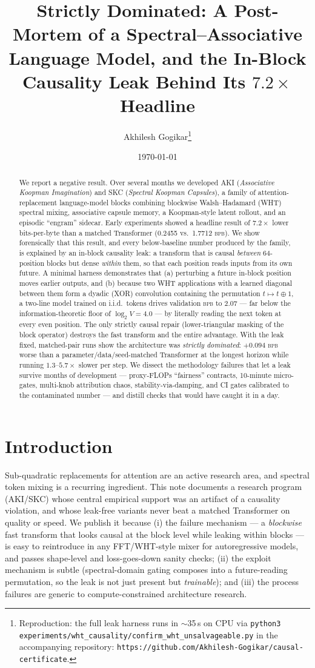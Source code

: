 \documentclass[11pt]{article}
\title{Strictly Dominated: A Post-Mortem of a Spectral--Associative Language
Model, and the In-Block Causality Leak Behind Its $7.2\times$ Headline}
\author{Akhilesh Gogikar\thanks{Reproduction: the full leak harness runs in
$\sim$35\,s on CPU via \texttt{python3
experiments/wht\_causality/confirm\_wht\_unsalvageable.py} in the accompanying
repository: \texttt{https://github.com/Akhilesh-Gogikar/causal-certificate}.}}
\date{\today}
\newcommand{\bpb}{\textsc{bpb}}
\begin{document}
\maketitle

\begin{abstract}
We report a negative result. Over several months we developed AKI
(\emph{Associative Koopman Imagination}) and SKC (\emph{Spectral Koopman
Capsules}), a family
of attention-replacement language-model blocks combining blockwise
Walsh--Hadamard (WHT) spectral mixing, associative capsule memory, a Koopman-style
latent rollout, and an episodic ``engram'' sidecar. Early experiments showed a
headline result of $7.2\times$ lower bits-per-byte than a matched Transformer
(0.2455 vs.\ 1.7712 \bpb). We show forensically that this result, and every
below-baseline number produced by the family, is explained by an in-block
causality leak: a transform that is causal \emph{between} 64-position blocks but
dense \emph{within} them, so that each position reads inputs from its own
future. A minimal harness demonstrates that (a) perturbing a future in-block
position moves earlier outputs, and (b) because two WHT applications with a
learned diagonal between them form a dyadic (XOR) convolution containing the
permutation $t \mapsto t \oplus 1$, a two-line model trained on i.i.d.\ tokens
drives validation \bpb{} to 2.07 --- far below the information-theoretic floor of
$\log_2 V = 4.0$ --- by literally reading the next token at every even position.
The only strictly causal repair (lower-triangular masking of the block operator)
destroys the fast transform and the entire advantage. With the leak fixed,
matched-pair runs show the architecture was \emph{strictly dominated}: $+0.094$
\bpb{} worse than a parameter/data/seed-matched Transformer at the longest
horizon while running $1.3$--$5.7\times$ slower per step. We dissect the
methodology failures that let a leak survive months of development ---
proxy-FLOPs ``fairness'' contracts, 10-minute micro-gates, multi-knob
attribution chaos, stability-via-damping, and CI gates calibrated to the
contaminated number --- and distill checks that would have caught it in a day.
\end{abstract}

\section{Introduction}
Sub-quadratic replacements for attention are an active research area, and
spectral token mixing is a recurring ingredient. This note documents a
research program (AKI/SKC) whose central empirical support was an artifact of a
causality violation, and whose leak-free variants never beat a matched
Transformer on quality or speed. We publish it because (i) the failure
mechanism --- a \emph{blockwise} fast transform that looks causal at the block
level while leaking within blocks --- is easy to reintroduce in any
FFT/WHT-style mixer for autoregressive models, and passes shape-level and
loss-goes-down sanity checks; (ii) the exploit mechanism is subtle
(spectral-domain gating composes into a future-reading permutation, so the leak
is not just present but \emph{trainable}); and (iii) the process failures are
generic to compute-constrained architecture research.
\end{document}

